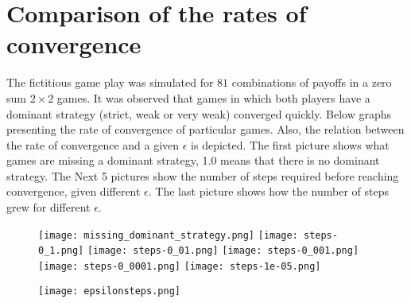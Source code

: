 \documentclass{article}
\begin{document}
\section{Comparison of the rates of convergence}
The fictitious game play was simulated for $81$ combinations of payoffs in a zero sum $2 \times 2$ games. It was observed that games in which both players have a dominant strategy (strict, weak or very weak) converged quickly. Below graphs presenting the rate of convergence of particular games. Also, the relation between the rate of convergence and a given $\epsilon$ is depicted.
The first picture shows what games are missing a dominant strategy, 1.0 means that there is no dominant strategy.
The Next 5 pictures show the number of steps required before reaching convergence, given different $\epsilon$.
The last picture shows how the number of steps grew for different $\epsilon$.
\begin{figure}[H]
  \texttt{[image: missing\_dominant\_strategy.png]}
  \texttt{[image: steps-0\_1.png]}
  \texttt{[image: steps-0\_01.png]}
  \texttt{[image: steps-0\_001.png]}
  \texttt{[image: steps-0\_0001.png]}
  \texttt{[image: steps-1e-05.png]}
\end{figure}
\begin{figure}[H]
  \texttt{[image: epsilonsteps.png]}
\end{figure}
\end{document}
